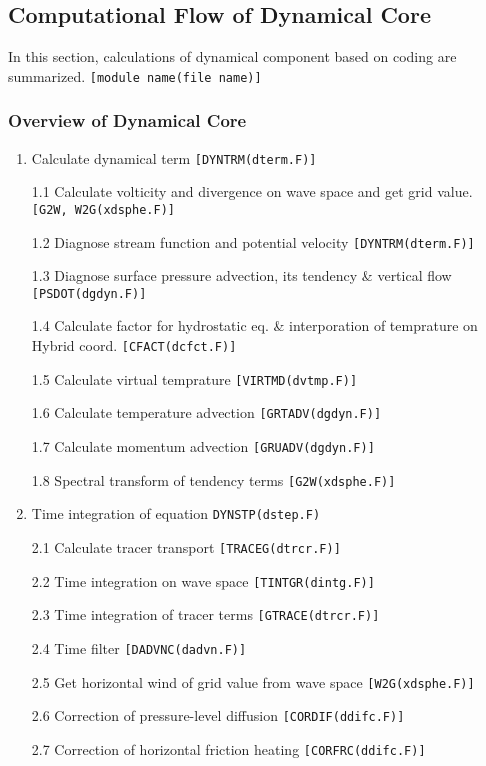 \hypertarget{computational-flow-of-dynamical-core}{%
\subsection{Computational Flow of Dynamical Core}\label{computational-flow-of-dynamical-core}}

In this section, calculations of dynamical component based on coding are summarized. \texttt{{[}module\ name(file\ name){]}}

\hypertarget{overview-of-dynamical-core}{%
\subsubsection{Overview of Dynamical Core}\label{overview-of-dynamical-core}}

\begin{enumerate}
\def\labelenumi{\arabic{enumi}.}
\item
  Calculate dynamical term \texttt{{[}DYNTRM(dterm.F){]}}

  1.1 Calculate volticity and divergence on wave space and get grid value. \texttt{{[}G2W,\ W2G(xdsphe.F){]}}

  1.2 Diagnose stream function and potential velocity \texttt{{[}DYNTRM(dterm.F){]}}

  1.3 Diagnose surface pressure advection, its tendency \& vertical flow \texttt{{[}PSDOT(dgdyn.F){]}}

  1.4 Calculate factor for hydrostatic eq. \& interporation of temprature on Hybrid coord. \texttt{{[}CFACT(dcfct.F){]}}

  1.5 Calculate virtual temprature \texttt{{[}VIRTMD(dvtmp.F){]}}

  1.6 Calculate temperature advection \texttt{{[}GRTADV(dgdyn.F){]}}

  1.7 Calculate momentum advection \texttt{{[}GRUADV(dgdyn.F){]}}

  1.8 Spectral transform of tendency terms \texttt{{[}G2W(xdsphe.F){]}}
\item
  Time integration of equation \texttt{DYNSTP(dstep.F)}

  2.1 Calculate tracer transport \texttt{{[}TRACEG(dtrcr.F){]}}

  2.2 Time integration on wave space \texttt{{[}TINTGR(dintg.F){]}}

  2.3 Time integration of tracer terms \texttt{{[}GTRACE(dtrcr.F){]}}

  2.4 Time filter \texttt{{[}DADVNC(dadvn.F){]}}

  2.5 Get horizontal wind of grid value from wave space \texttt{{[}W2G(xdsphe.F){]}}

  2.6 Correction of pressure-level diffusion \texttt{{[}CORDIF(ddifc.F){]}}

  2.7 Correction of horizontal friction heating \texttt{{[}CORFRC(ddifc.F){]}}
\end{enumerate}
